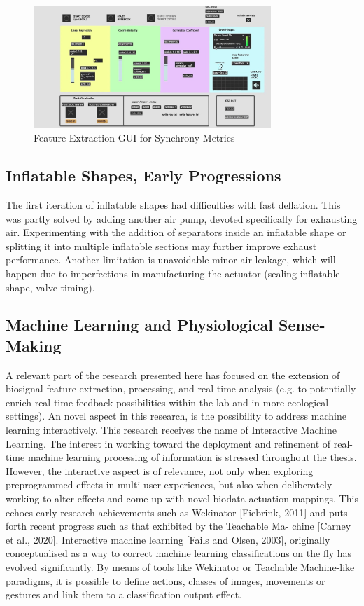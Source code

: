 \begin{figure}[htbp]
	\centering
	\includegraphics[width=0.8\textwidth]{Chapters/Figures/Feature_Extraction_Sync_MAX.jpg}
	\caption{Feature Extraction GUI for Synchrony Metrics}
	\label{fig:Concept_Venn}
\end{figure}

\subsection{Inflatable Shapes, Early Progressions}

The first iteration of inflatable shapes had difficulties with fast deflation. This was partly solved by adding another air pump, devoted specifically for exhausting air. Experimenting with the addition of separators inside an inflatable shape or splitting it into multiple inflatable sections may further improve exhaust performance. Another limitation is unavoidable minor air leakage, which will happen due to imperfections in manufacturing the actuator (sealing inflatable shape, valve timing).

\subsection{Machine Learning and Physiological Sense-Making}

A relevant part of the research presented here has focused on the extension of biosignal feature extraction, processing, and real-time analysis (e.g. to potentially enrich real-time feedback possibilities within the lab and in more ecological settings).  An novel aspect in this research, is the possibility to address machine learning interactively. This research receives the name of Interactive Machine Learning. The interest in working toward the deployment and refinement of real-time machine learning processing of information is stressed throughout the thesis. However, the interactive aspect is of relevance, not only when exploring preprogrammed effects in multi-user experiences, but also when deliberately working to alter effects and come up with novel biodata-actuation mappings. This echoes early research achievements such as Wekinator [Fiebrink, 2011] and puts forth recent progress such as that exhibited by the Teachable Ma- chine [Carney et al., 2020]. Interactive machine learning [Fails and Olsen, 2003], originally conceptualised as a way to correct machine learning classifications on the fly has evolved significantly. By means of tools like Wekinator or Teachable Machine-like paradigms, it is possible to define actions, classes of images, movements or gestures and link them to a classification output effect. 

